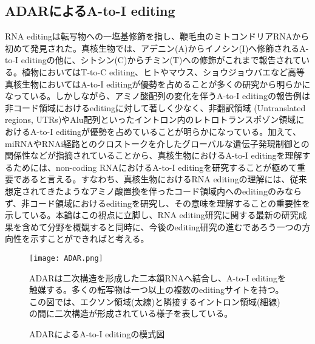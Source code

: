 \subsection{ADARによるA-to-I editing}
RNA editingは転写物への一塩基修飾を指し、鞭毛虫のミトコンドリアRNAから初めて発見された。真核生物では、アデニン(A)からイノシン(I)へ修飾されるA-to-I editingの他に、シトシン(C)からチミン(T)への修飾がこれまで報告されている。植物においてはT-to-C editing、ヒトやマウス、ショウジョウバエなど高等真核生物においてはA-to-I editingが優勢を占めることが多くの研究から明らかになっている。しかしながら、アミノ酸配列の変化を伴うA-to-I editingの報告例は非コード領域におけるeditingに対して著しく少なく、非翻訳領域 (Untranslated regions, UTRs)やAlu配列といったイントロン内のレトロトランスポゾン領域におけるA-to-I editingが優勢を占めていることが明らかになっている。加えて、miRNAやRNAi経路とのクロストークを介したグローバルな遺伝子発現制御との関係性などが指摘されていることから、真核生物におけるA-to-I editingを理解するためには、non-coding RNAにおけるA-to-I editingを研究することが極めて重要であると言える。すなわち、真核生物におけるRNA editingの理解には、従来想定されてきたようなアミノ酸置換を伴ったコード領域内へのeditingのみならず、非コード領域におけるeditingを研究し、その意味を理解することの重要性を示している。本論はこの視点に立脚し、RNA editing研究に関する最新の研究成果を含めて分野を概観すると同時に、今後のediting研究の進むであろう一つの方向性を示すことができればと考える。
\begin{figure}[htbp]
	\begin{center}
		\texttt{[image: ADAR.png]}
	\end{center}
	\caption{ADARによるA-to-I editingの模式図}
	\begin{flushleft}
		\small{ADARは二次構造を形成した二本鎖RNAへ結合し、A-to-I editingを触媒する。多くの転写物は一つ以上の複数のeditingサイトを持つ。この図では、エクソン領域(太線)と隣接するイントロン領域(細線)の間に二次構造が形成されている様子を表している。}
	\end{flushleft}
	\label{fig:ADAR}
\end{figure}

